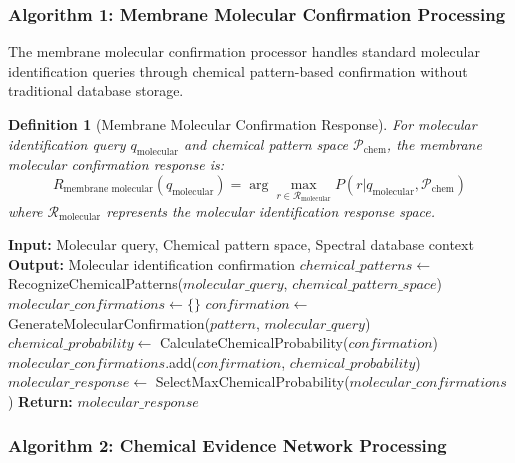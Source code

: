\documentclass[11pt,a4paper]{article}
\newtheorem{definition}[theorem]{Definition}
\theoremstyle{remark}
\begin{document}
{{{{{{{{{{\subsubsection{Algorithm 1: Membrane Molecular Confirmation Processing}

The membrane molecular confirmation processor handles standard molecular identification queries through chemical pattern-based confirmation without traditional database storage.

\begin{definition}[Membrane Molecular Confirmation Response]
For molecular identification query $q_{\text{molecular}}$ and chemical pattern space $\mathcal{P}_{\text{chem}}$, the membrane molecular confirmation response is:
\begin{equation}
R_{\text{membrane molecular}}(q_{\text{molecular}}) = \arg\max_{r \in \mathcal{R}_{\text{molecular}}} P(r | q_{\text{molecular}}, \mathcal{P}_{\text{chem}})
\end{equation}
where $\mathcal{R}_{\text{molecular}}$ represents the molecular identification response space.
\end{definition}

\begin{algorithm}[H]
\caption{Sachikonye's Molecular Search Algorithm 1}
\begin{algorithmic}[1]
\State \textbf{Input:} Molecular query, Chemical pattern space, Spectral database context
\State \textbf{Output:} Molecular identification confirmation
    \State $chemical\_patterns \gets$ RecognizeChemicalPatterns($molecular\_query$, $chemical\_pattern\_space$)
    \State $molecular\_confirmations \gets \{\}$
        \State $confirmation \gets$ GenerateMolecularConfirmation($pattern$, $molecular\_query$)
        \State $chemical\_probability \gets$ CalculateChemicalProbability($confirmation$)
        \State $molecular\_confirmations$.add($confirmation$, $chemical\_probability$)
    \EndFor
    \State $molecular\_response \gets$ SelectMaxChemicalProbability($molecular\_confirmations$)
    \State \textbf{Return:} $molecular\_response$
\EndProcedure
\end{algorithmic}
\end{algorithm}

\subsubsection{Algorithm 2: Chemical Evidence Network Processing}

}}}}}}}}}}
\end{document}
